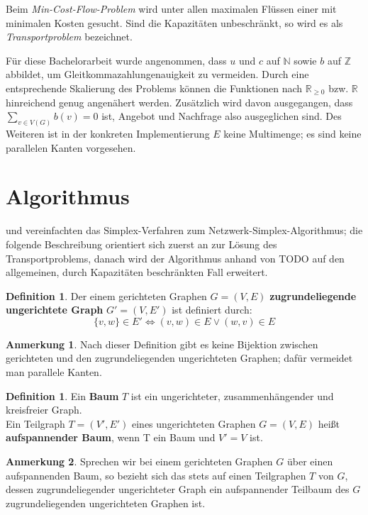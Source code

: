 \documentclass[a4paper,twoside,ngerman]{report}
\theoremstyle{plain}
\theoremstyle{definition}
\newtheorem{defn}[thm]{Definition}
\newtheorem*{anm}{Anmerkung}
\begin{document}
Beim \emph{Min-Cost-Flow-Problem} wird unter allen maximalen Flüssen einer mit minimalen Kosten gesucht. Sind die Kapazitäten unbeschränkt, so wird es als \emph{Transportproblem} bezeichnet.

Für diese Bachelorarbeit wurde angenommen, dass $u$ und $c$ auf $\mathbb{N}$ sowie $b$ auf $\mathbb{Z}$ abbildet, um Gleitkommazahlungenauigkeit zu vermeiden. Durch eine entsprechende Skalierung des Problems können die Funktionen nach $\mathbb{R}_{\geq 0}$ bzw. $\mathbb{R}$ hinreichend genug angenähert werden. Zusätzlich wird davon ausgegangen, dass $\sum_{v\in V(G)} b(v) = 0$ ist, Angebot und Nachfrage also ausgeglichen sind. Des Weiteren ist in der konkreten Implementierung $E$ keine Multimenge; es sind keine parallelen Kanten vorgesehen.

\section{Algorithmus}
\cite[Dantzig, 1951]{erf1} und \cite[Orden, 1956]{erf2} vereinfachten das Simplex-Verfahren zum Netzwerk-Simplex-Algorithmus; die folgende Beschreibung orientiert sich zuerst an \cite[S. 291\,ff.]{NSAbook} zur Lösung des Transportproblems, danach wird der Algorithmus anhand von TODO auf den allgemeinen, durch Kapazitäten beschränkten Fall erweitert.

\begin{defn}Der einem gerichteten Graphen $G=(V,E)$ \textbf{zugrundeliegende ungerichtete Graph} $G'=(V,E')$ ist definiert durch:\\
\begin{equation*}\{v,w\}\in E' \iff (v,w) \in E \lor (w,v) \in E\end{equation*} \end{defn}
\begin{anm}Nach dieser Definition gibt es keine Bijektion zwischen gerichteten und den zugrundeliegenden ungerichteten Graphen; dafür vermeidet man parallele Kanten.\end{anm}
\begin{defn}Ein \textbf{Baum} $T$ ist ein ungerichteter, zusammenhängender und kreisfreier Graph.\\
Ein Teilgraph $T=(V',E')$ eines ungerichteten Graphen $G=(V,E)$ heißt \textbf{aufspannender Baum}, wenn T ein Baum und $V'=V$ ist.\end{defn}
\begin{anm}Sprechen wir bei einem gerichteten Graphen $G$ über einen aufspannenden Baum, so bezieht sich das stets auf einen Teilgraphen $T$ von $G$, dessen zugrundeliegender ungerichteter Graph ein aufspannender Teilbaum des $G$ zugrundeliegenden ungerichteten Graphen ist.\end{anm}
\end{document}
